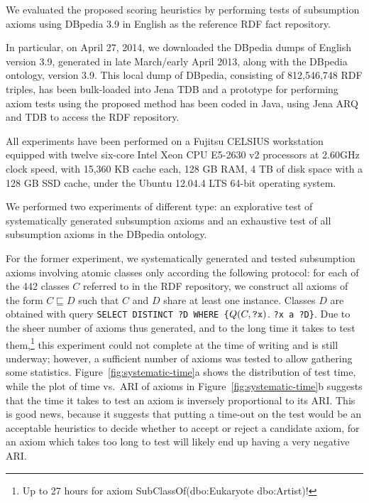 \documentclass{llncs}
\begin{document}
We evaluated the proposed scoring heuristics by performing tests of subsumption
axioms using DBpedia 3.9 in English as the reference RDF fact repository.

In particular, on April 27, 2014, we downloaded the DBpedia dumps of English version 3.9,
generated in late March/early April 2013, along with the DBpedia ontology, version 3.9.
This local dump of DBpedia, consisting of 812,546,748 RDF triples,
has been bulk-loaded into Jena TDB and a prototype
for performing axiom tests using the proposed method has been coded in Java,
using Jena ARQ and TDB to access the RDF repository.

All experiments have been performed on a Fujitsu CELSIUS workstation equipped
with twelve six-core Intel Xeon CPU E5-2630 v2 processors at 2.60GHz clock speed,
with 15,360 KB cache each, 128 GB RAM,
4 TB of disk space with a 128 GB SSD cache,
under the Ubuntu  12.04.4 LTS 64-bit operating system.


We performed two experiments of different type: an explorative test of systematically
generated subsumption axioms and an exhaustive test of all subsumption axioms
in the DBpedia ontology.

For the former experiment, we systematically generated and tested subsumption axioms
involving atomic classes only according the following protocol:
for each of the 442 classes $C$ referred to in the RDF repository, we construct all axioms of the form
$C \sqsubseteq D$ such that $C$ and $D$ share at least one instance. Classes $D$ are obtained
with query \texttt{SELECT DISTINCT ?D WHERE \{}$Q(C, \mbox{\tt ?x})$. \texttt{?x a ?D\}}.
Due to the sheer number of axioms thus generated, and to the long time
it takes to test them,\footnote{Up to 27 hours for axiom \textsf{SubClassOf}(\textsf{dbo:Eukaryote} \textsf{dbo:Artist})!}
this experiment could not complete at the time of writing and is still underway;
however, a sufficient number of axioms was tested to allow gathering some statistics.
Figure~\ref{fig:systematic-time}a shows the distribution of test time,
while the plot of time vs.\ ARI of axioms in Figure~\ref{fig:systematic-time}b
suggests that the time it takes to test an axiom is inversely proportional to its
ARI. This is good news, because it suggests that putting a time-out
on the test would be an acceptable heuristics to decide whether to accept or reject
a candidate axiom, for an axiom which takes too long to test will likely end up
having a very negative ARI.
\end{document}
